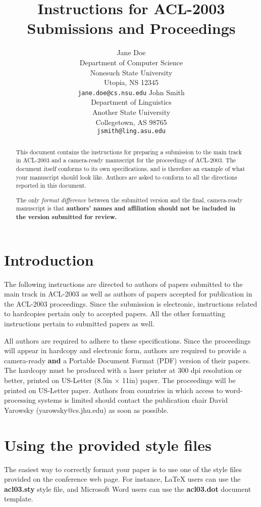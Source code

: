 \documentclass[11pt]{article}
\title{Instructions for ACL-2003 Submissions and Proceedings}
\author{Jane Doe\\
  Department of Computer Science \\
  Nonesuch State University \\
  Utopia, NS 12345 \\
  {\tt jane.doe@cs.nsu.edu} \And
  John Smith \\
  Department of Linguistics \\
  Another State University \\
  Collegetown, AS 98765 \\  
  {\tt jsmith@ling.asu.edu}}
\date{}
\begin{document}
\maketitle

\begin{abstract}
  This document contains the instructions for preparing a submission to the main
  track in ACL-2003 and a camera-ready manuscript for the proceedings of ACL-2003.
  The document itself conforms
  to its own specifications, and is therefore an example of what
  your manuscript should look like.  Authors are asked to conform to
  all the directions reported in this document.

  The only {\em format difference} between the submitted version and
  the final, camera-ready manuscript is that {\bf
  authors' names and affiliation should not be included
  in the version submitted for review.}
\end{abstract}

\section{Introduction}

The following instructions are directed to authors of
papers submitted to the main track in ACL-2003 as well as
authors of papers accepted for publication in the ACL-2003 proceedings.
Since the submission is electronic, instructions related to hardcopies
pertain only to accepted papers. All the other formatting instructions
pertain to submitted papers as well.

All authors are required to adhere to these
specifications. Since the proceedings will appear in
hardcopy and electronic form, authors are required to
provide a camera-ready {\bf and} a Portable Document
Format (PDF) version of their papers. The hardcopy must
be produced with a laser printer at 300 dpi resolution
or better, printed on US-Letter (8.5in $\times$ 11in)
paper. The proceedings will be printed on US-Letter
paper. Authors from countries in which access to
word-processing systems is limited should contact the
publication chair David Yarowsky (yarowsky@cs.jhu.edu)
as soon as possible.

\section{Using the provided style files}

The easiest way to correctly format your paper is to use one of the
style files provided on the conference web page. For instance, \LaTeX{}
users can use the {\bf acl03.sty} style file, and Microsoft Word
users can use the {\bf acl03.dot} document template.
\end{document}
